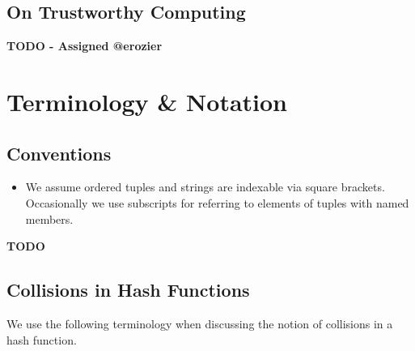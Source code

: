 \documentclass[conference]{IEEEtran}
\begin{document}
\subsection{On Trustworthy Computing}

\textbf{TODO - Assigned @erozier}






\section{Terminology \& Notation}  \label{Sec:Terminology}

\subsection{Conventions}
\begin{itemize}
    \item We assume ordered tuples and strings are indexable via square
        brackets. Occasionally we use subscripts for referring to
        elements of tuples with named members.
\end{itemize}

\textbf{TODO}

\subsection{Collisions in Hash Functions}

We use the following terminology when discussing the notion of collisions in
a hash function.
\end{document}
